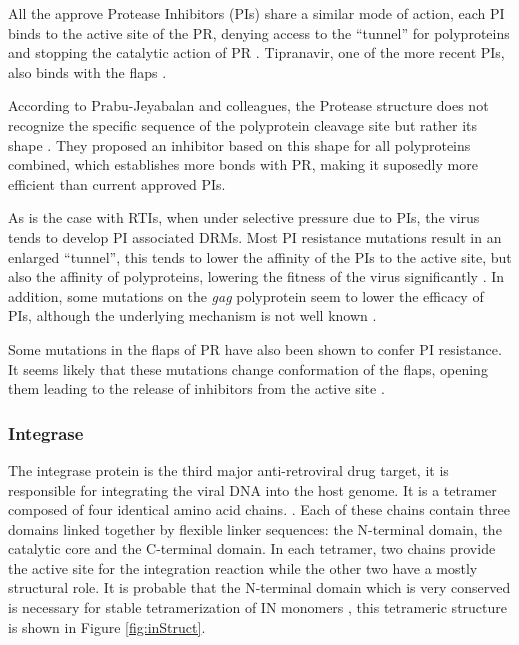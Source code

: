 \documentclass[
  11pt,
  twoside]{scrbook}
\begin{document}
All the approve Protease Inhibitors (PIs) share a similar mode of action, each PI binds to the active site of the PR, denying access to the ``tunnel'' for polyproteins and stopping the catalytic action of PR \autocite{robertsRationalDesignPeptideBased1990,lvHIVProteaseInhibitors2015}. Tipranavir, one of the more recent PIs, also binds with the flaps \autocite{lvHIVProteaseInhibitors2015}.

According to Prabu-Jeyabalan and colleagues, the Protease structure does not recognize the specific sequence of the polyprotein cleavage site but rather its shape \autocite{prabu-jeyabalanSubstrateShapeDetermines2002}. They proposed an inhibitor based on this shape for all polyproteins combined, which establishes more bonds with PR, making it suposedly more efficient \autocite{prabu-jeyabalanSubstrateEnvelopeDrug2006} than current approved PIs.

As is the case with RTIs, when under selective pressure due to PIs, the virus tends to develop PI associated DRMs. Most PI resistance mutations result in an enlarged ``tunnel'', this tends to lower the affinity of the PIs to the active site, but also the affinity of polyproteins, lowering the fitness of the virus significantly \autocite{wensingFifteenYearsHIV2010}. In addition, some mutations on the \emph{gag} polyprotein seem to lower the efficacy of PIs, although the underlying mechanism is not well known \autocite{wensingFifteenYearsHIV2010}.

Some mutations in the flaps of PR have also been shown to confer PI resistance. It seems likely that these mutations change conformation of the flaps, opening them leading to the release of inhibitors from the active site \autocite{kurtyilmazImprovingViralProtease2016}.

\hypertarget{integrase}{%
\subsubsection{Integrase}\label{integrase}}

The integrase protein is the third major anti-retroviral drug target, it is responsible for integrating the viral DNA into the host genome. It is a tetramer composed of four identical amino acid chains. \autocite{chiuStructureFunctionHIV12004,espositoHIVIntegraseStructure1999}. Each of these chains contain three domains linked together by flexible linker sequences: the N-terminal domain, the catalytic core and the C-terminal domain. In each tetramer, two chains provide the active site for the integration reaction while the other two have a mostly structural role. It is probable that the N-terminal domain which is very conserved is necessary for stable tetramerization of IN monomers \autocite{delelisIntegraseIntegrationBiochemical2008}, this tetrameric structure is shown in Figure \ref{fig:inStruct}.
\end{document}
